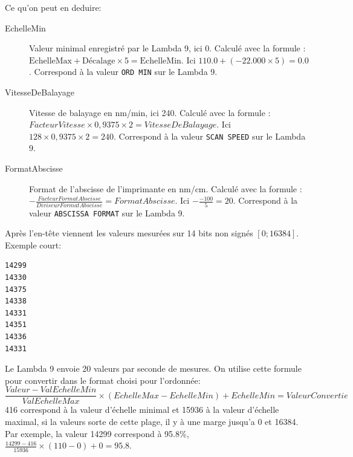 \documentclass[a4paper, 12pt]{article}
\begin{document}
\begin{description}
\end{description}
Ce qu'on peut en deduire:

\begin{description}
	\item[EchelleMin] Valeur minimal enregistré par le Lambda 9, ici 0. Calculé avec la formule : $ \text{EchelleMax} + \text{Décalage} \times 5 = \text{EchelleMin}$. Ici $110.0 + ( -22.000 \times 5 ) = 0.0$. Correspond à la valeur \verb|ORD MIN| sur le Lambda 9.
	\item[VitesseDeBalayage] Vitesse de balayage en nm/min, ici 240. Calculé avec la formule : $FacteurVitesse \times 0,9375 \times 2 = VitesseDeBalayage$. Ici $128 \times 0,9375 \times 2 = 240$. Correspond à la valeur \verb|SCAN SPEED| sur le Lambda 9.

	\item[FormatAbscisse] Format de l'abscisse de l'imprimante en nm/cm. Calculé avec la formule : $ { - \frac{FacteurFormatAbscisse}{DiviseurFormatAbscisse} } = FormatAbscisse$. Ici $ - \frac{-100}{5} = 20$. Correspond à la valeur \verb|ABSCISSA FORMAT| sur le Lambda 9.


\end{description}

Après l'en-tête viennent les valeurs mesurées sur 14 bits non signés $[0;16384]$. Exemple court:  

\begin{lstlisting}
14299
14330
14375
14338
14331
14351
14336
14331
\end{lstlisting}
Le Lambda 9 envoie 20 valeurs par seconde de mesures. %
On utilise cette formule pour convertir dans le format choisi pour l'ordonnée:
\[ \frac{Valeur - ValEchelleMin}{ValEchelleMax} \times (EchelleMax - EchelleMin) + EchelleMin = ValeurConvertie \]
416 correspond à la valeur d'échelle minimal et 15936 à la valeur d'échelle maximal, si la valeurs sorte de cette plage, il y à une marge jusqu'a 0 et 16384.
Par exemple, la valeur 14299 correspond à 95.8\%, $\frac{14299-416}{15936} \times (110-0)+0 = 95.8$.
\end{document}

